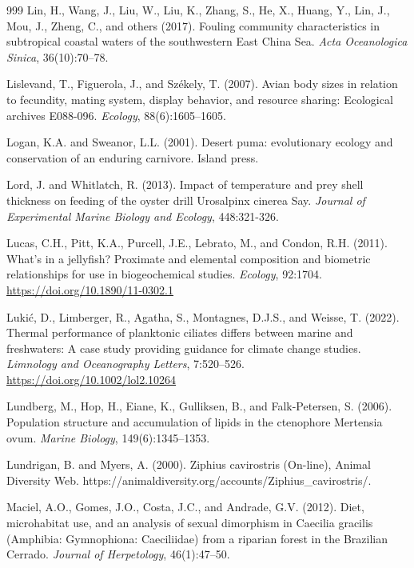 \begin{thebibliography}{999}
Lin, H., Wang, J., Liu, W., Liu, K., Zhang, S., He, X., Huang, Y., Lin, J., Mou, J., Zheng, C., and others (2017). Fouling community characteristics in subtropical coastal waters of the southwestern East China Sea. \textit{Acta Oceanologica Sinica}, 36(10):70--78.

Lislevand, T., Figuerola, J., and Sz{\'e}kely, T. (2007). Avian body sizes in relation to fecundity, mating system, display behavior, and resource sharing: Ecological archives E088-096. \textit{Ecology}, 88(6):1605--1605.

Logan, K.A. and Sweanor, L.L. (2001). Desert puma: evolutionary ecology and conservation of an enduring carnivore. Island press.

Lord, J. and Whitlatch, R. (2013). Impact of temperature and prey shell thickness on feeding of the oyster drill Urosalpinx cinerea Say. \textit{Journal of Experimental Marine Biology and Ecology}, 448:321-326.

Lucas, C.H., Pitt, K.A., Purcell, J.E., Lebrato, M., and Condon, R.H. (2011). What's in a jellyfish? Proximate and elemental composition and biometric relationships for use in biogeochemical studies. \textit{Ecology}, 92:1704. \url{https://doi.org/10.1890/11-0302.1}

Luki{\'c}, D., Limberger, R., Agatha, S., Montagnes, D.J.S., and Weisse, T. (2022). Thermal performance of planktonic ciliates differs between marine and freshwaters: A case study providing guidance for climate change studies. \textit{Limnology and Oceanography Letters}, 7:520--526. \url{https://doi.org/10.1002/lol2.10264}

Lundberg, M., Hop, H., Eiane, K., Gulliksen, B., and Falk-Petersen, S. (2006). Population structure and accumulation of lipids in the ctenophore Mertensia ovum. \textit{Marine Biology}, 149(6):1345--1353.

Lundrigan, B. and Myers, A. (2000). Ziphius cavirostris (On-line), {A}nimal {D}iversity {W}eb. https://animaldiversity.org/accounts/Ziphius\_cavirostris/.

Maciel, A.O., Gomes, J.O., Costa, J.C., and Andrade, G.V. (2012). Diet, microhabitat use, and an analysis of sexual dimorphism in Caecilia gracilis (Amphibia: Gymnophiona: Caeciliidae) from a riparian forest in the Brazilian Cerrado. \textit{Journal of Herpetology}, 46(1):47--50.


\end{thebibliography}
